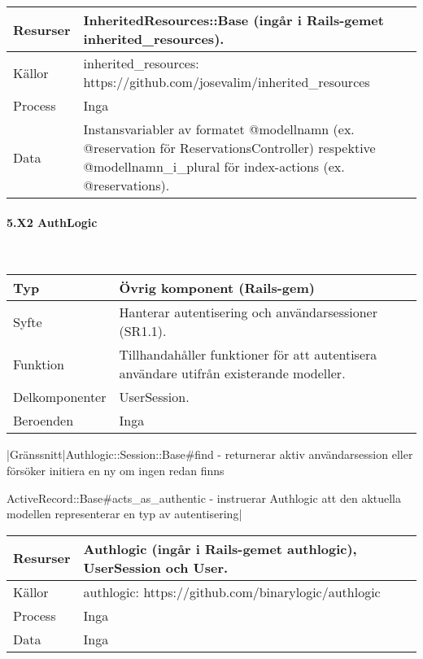 \documentclass[a4paper, twoside, 11pt, titlepage]{article}
\begin{document}
			\begin {table} [ht] \begin{tabular} {  p{3.5cm} p{9.6cm} }
				\hline
				Resurser & InheritedResources::Base (ingår i Rails-gemet inherited\_resources).  \\
				\hline
				Källor & inherited\_resources: https://github.com/josevalim/inherited\_resources  \\
				\hline
				Process & Inga  \\
				\hline
				Data & Instansvariabler av formatet @modellnamn (ex. @reservation för ReservationsController) respektive @modellnamn\_i\_plural för index-actions (ex. @reservations).  \\
				\hline
			\end{tabular} \end{table} \FloatBarrier


			\paragraph{5.X2 AuthLogic}\

			\begin {table} [ht] \begin{tabular} {  p{3.5cm} p{9.6cm} }
				\hline
				Typ & Övrig komponent (Rails-gem)  \\
				\hline
				Syfte & Hanterar autentisering och användarsessioner (SR1.1).  \\
				\hline
				Funktion & Tillhandahåller funktioner för att autentisera användare utifrån existerande modeller.  \\
				\hline
				Delkomponenter & UserSession.  \\
				\hline
				Beroenden & Inga  \\
				\hline
			\end{tabular} \end{table} \FloatBarrier
			\vspace{6mm}

			|Gränssnitt|Authlogic::Session::Base\#find - returnerar aktiv användarsession eller försöker initiera en ny om ingen redan finns

			ActiveRecord::Base\#acts\_as\_authentic - instruerar Authlogic att den aktuella modellen representerar en typ av autentisering|

			\begin {table} [ht] \begin{tabular} {  p{3.5cm} p{9.6cm} }
				\hline
				Resurser & Authlogic (ingår i Rails-gemet authlogic), UserSession och User.  \\
				\hline
				Källor & authlogic: https://github.com/binarylogic/authlogic  \\
				\hline
				Process & Inga  \\
				\hline
				Data & Inga  \\
				\hline
			\end{tabular} \end{table} \FloatBarrier
\end{document}
